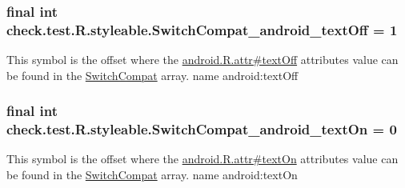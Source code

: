 \subsubsection[{Switch\+Compat\+\_\+android\+\_\+text\+Off}]{\setlength{\rightskip}{0pt plus 5cm}final int check.\+test.\+R.\+styleable.\+Switch\+Compat\+\_\+android\+\_\+text\+Off = 1\hspace{0.3cm}{\ttfamily [static]}}\label{classcheck_1_1test_1_1_r_1_1styleable_ab84183d5d84d551d811f6b8114e6cf0c}
This symbol is the offset where the \hyperlink{}{android.\+R.\+attr\#text\+Off} attribute\textquotesingle{}s value can be found in the \hyperlink{classcheck_1_1test_1_1_r_1_1styleable_a0c8f3659ebec12826f8a2493fe43eaf4}{Switch\+Compat} array.  name android\+:text\+Off \hypertarget{classcheck_1_1test_1_1_r_1_1styleable_a23563184e5ab5fb5a8d99269e8aba6cb}{}
\subsubsection[{Switch\+Compat\+\_\+android\+\_\+text\+On}]{\setlength{\rightskip}{0pt plus 5cm}final int check.\+test.\+R.\+styleable.\+Switch\+Compat\+\_\+android\+\_\+text\+On = 0\hspace{0.3cm}{\ttfamily [static]}}\label{classcheck_1_1test_1_1_r_1_1styleable_a23563184e5ab5fb5a8d99269e8aba6cb}
This symbol is the offset where the \hyperlink{}{android.\+R.\+attr\#text\+On} attribute\textquotesingle{}s value can be found in the \hyperlink{classcheck_1_1test_1_1_r_1_1styleable_a0c8f3659ebec12826f8a2493fe43eaf4}{Switch\+Compat} array.  name android\+:text\+On \hypertarget{classcheck_1_1test_1_1_r_1_1styleable_a22ffd7de92a4d9d0703e1c36ee15e59c}{}
